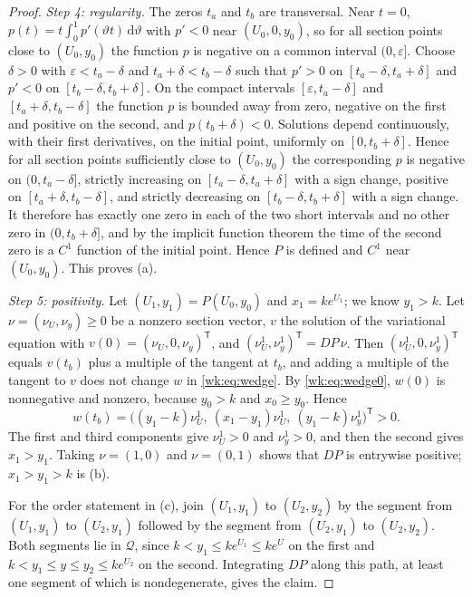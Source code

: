 \begin{proof}
\emph{Step 4: regularity.} The zeros $t_a$ and $t_b$ are transversal. Near $t=0$, $p(t)=t\int_0^1p'(\vartheta t)\,\mathrm d\vartheta$ with $p'<0$ near $(U_0,0,y_0)$, so for all section points close to $(U_0,y_0)$ the function $p$ is negative on a common interval $(0,\varepsilon]$. Choose $\delta>0$ with $\varepsilon<t_a-\delta$ and $t_a+\delta<t_b-\delta$ such that $p'>0$ on $[t_a-\delta,t_a+\delta]$ and $p'<0$ on $[t_b-\delta,t_b+\delta]$. On the compact intervals $[\varepsilon,t_a-\delta]$ and $[t_a+\delta,t_b-\delta]$ the function $p$ is bounded away from zero, negative on the first and positive on the second, and $p(t_b+\delta)<0$. Solutions depend continuously, with their first derivatives, on the initial point, uniformly on $[0,t_b+\delta]$. Hence for all section points sufficiently close to $(U_0,y_0)$ the corresponding $p$ is negative on $(0,t_a-\delta]$, strictly increasing on $[t_a-\delta,t_a+\delta]$ with a sign change, positive on $[t_a+\delta,t_b-\delta]$, and strictly decreasing on $[t_b-\delta,t_b+\delta]$ with a sign change. It therefore has exactly one zero in each of the two short intervals and no other zero in $(0,t_b+\delta]$, and by the implicit function theorem the time of the second zero is a $C^1$ function of the initial point. Hence $P$ is defined and $C^1$ near $(U_0,y_0)$. This proves (a).

\emph{Step 5: positivity.} Let $(U_1,y_1)=P(U_0,y_0)$ and $x_1=ke^{U_1}$; we know $y_1>k$. Let $\nu=(\nu_U,\nu_y)\ge0$ be a nonzero section vector, $v$ the solution of the variational equation with $v(0)=(\nu_U,0,\nu_y)^{\mathsf T}$, and $(\nu_U^1,\nu_y^1)^{\mathsf T}=DP\,\nu$. Then $(\nu_U^1,0,\nu_y^1)^{\mathsf T}$ equals $v(t_b)$ plus a multiple of the tangent at $t_b$, and adding a multiple of the tangent to $v$ does not change $w$ in \eqref{wk:eq:wedge}. By \eqref{wk:eq:wedge0}, $w(0)$ is nonnegative and nonzero, because $y_0>k$ and $x_0\ge y_0$. Hence
\[
w(t_b)=\bigl((y_1-k)\nu_U^1,\ (x_1-y_1)\nu_U^1,\ (y_1-k)\nu_y^1\bigr)^{\mathsf T}>0 .
\]
The first and third components give $\nu_U^1>0$ and $\nu_y^1>0$, and then the second gives $x_1>y_1$. Taking $\nu=(1,0)$ and $\nu=(0,1)$ shows that $DP$ is entrywise positive; $x_1>y_1>k$ is (b).

For the order statement in (c), join $(U_1,y_1)$ to $(U_2,y_2)$ by the segment from $(U_1,y_1)$ to $(U_2,y_1)$ followed by the segment from $(U_2,y_1)$ to $(U_2,y_2)$. Both segments lie in $\mathcal Q$, since $k<y_1\le ke^{U_1}\le ke^{U}$ on the first and $k<y_1\le y\le y_2\le ke^{U_2}$ on the second. Integrating $DP$ along this path, at least one segment of which is nondegenerate, gives the claim.


\end{proof}

